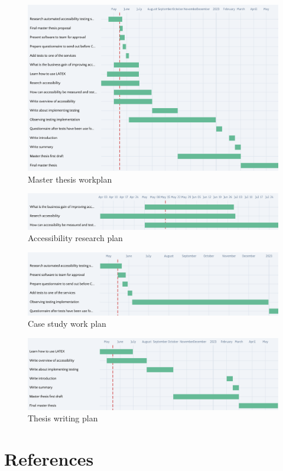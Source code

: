 \documentclass{thesis_proposal}
\begin{document}
\begin{figure}[ht!]
    \includegraphics[width=1\textwidth]{img/workplan.png}
    \caption{Master thesis workplan}
\end{figure}
\begin{figure}[ht!]
    \includegraphics[width=1\textwidth]{img/research_accessibility.png}
    \caption{Accessibility research plan}
\end{figure}
\begin{figure}[ht!]
    \includegraphics[width=1\textwidth]{img/case_study.png}
    \caption{Case study work plan}
\end{figure}
\begin{figure}[ht!]
    \includegraphics[width=1\textwidth]{img/thesis_writing.png}
    \caption{Thesis writing plan}
\end{figure}

\section{References}
\end{document}
